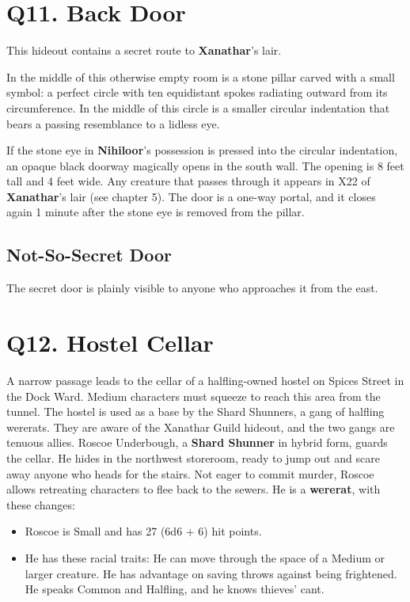 \documentclass[10pt,a4paper,twoside,twocolumn,openany,nodeprecatedcode]{dndbook}
\begin{document}
\section{Q11. Back Door}
This hideout contains a secret route to \textbf{Xanathar}'s lair.
\begin{DndReadAloud}{}
In the middle of this otherwise empty room is a stone pillar carved with a small symbol: a perfect circle with ten equidistant spokes radiating outward from its circumference. In the middle of this circle is a smaller circular indentation that bears a passing resemblance to a lidless eye.
\end{DndReadAloud}

If the stone eye in \textbf{Nihiloor}'s possession is pressed into the circular indentation, an opaque black doorway magically opens in the south wall. The opening is 8 feet tall and 4 feet wide. Any creature that passes through it appears in X22 of \textbf{Xanathar}'s lair (see chapter 5). The door is a one-way portal, and it closes again 1 minute after the stone eye is removed from the pillar.
\subsection{Not-So-Secret Door}
The secret door is plainly visible to anyone who approaches it from the east.
\section{Q12. Hostel Cellar}
A narrow passage leads to the cellar of a halfling-owned hostel on Spices Street in the Dock Ward. Medium characters must squeeze to reach this area from the tunnel. The hostel is used as a base by the Shard Shunners, a gang of halfling wererats. They are aware of the Xanathar Guild hideout, and the two gangs are tenuous allies.
Roscoe Underbough, a \textbf{Shard Shunner} in hybrid form, guards the cellar. He hides in the northwest storeroom, ready to jump out and scare away anyone who heads for the stairs. Not eager to commit murder, Roscoe allows retreating characters to flee back to the sewers. He is a \textbf{wererat}, with these changes:
\begin{itemize}

\item Roscoe is Small and has 27 (6d6 + 6) hit points.
\item He has these racial traits: He can move through the space of a Medium or larger creature. He has advantage on saving throws against being frightened. He speaks Common and Halfling, and he knows thieves' cant.
\end{itemize}
\end{document}
